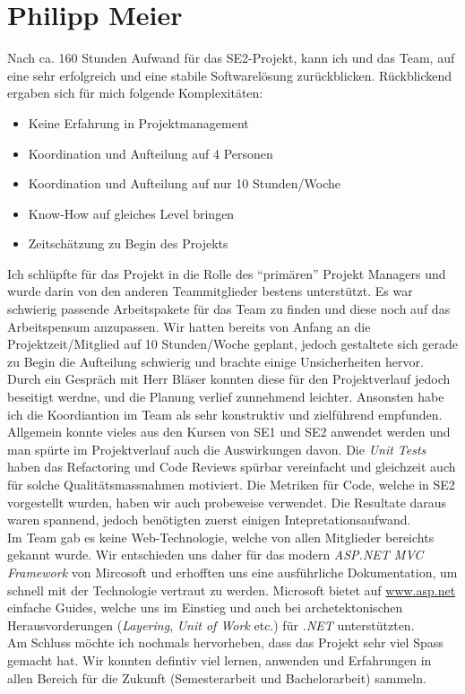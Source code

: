 	\section{Philipp Meier}
	Nach ca. 160 Stunden Aufwand für das SE2-Projekt, kann ich und das Team, auf eine sehr erfolgreich und eine stabile Softwarelösung zurückblicken. Rückblickend ergaben sich für mich folgende Komplexitäten:
	\\\begin{itemize}
		\item Keine Erfahrung in Projektmanagement
		\item Koordination und Aufteilung auf 4 Personen
		\item Koordination und Aufteilung auf nur 10 Stunden/Woche
		\item Know-How auf gleiches Level bringen
		\item Zeitschätzung zu Begin des Projekts
	\end{itemize}
	Ich schlüpfte für das Projekt in die Rolle des \enquote{primären} Projekt Managers und wurde darin von den anderen Teammitglieder bestens unterstützt. Es war schwierig passende Arbeitspakete für das Team zu finden und diese noch auf das Arbeitspensum anzupassen. Wir hatten bereits von Anfang an die Projektzeit/Mitglied auf 10 Stunden/Woche geplant, jedoch gestaltete sich gerade zu Begin die Aufteilung schwierig und brachte einige Unsicherheiten hervor. Durch ein Gespräch mit Herr Bläser konnten diese für den Projektverlauf jedoch beseitigt werdne, und die Planung verlief zunnehmend leichter. Ansonsten habe ich die Koordiantion im Team als sehr konstruktiv und zielführend empfunden.
	\\Allgemein konnte vieles aus den Kursen von SE1 und SE2 anwendet werden und man spürte im Projektverlauf auch die Auswirkungen davon. Die \textit{Unit Tests} haben das Refactoring und Code Reviews spürbar vereinfacht und gleichzeit auch für solche Qualitätsmassnahmen motiviert. Die Metriken für Code, welche in SE2 vorgestellt wurden, haben wir auch probeweise verwendet. Die Resultate daraus waren spannend, jedoch benötigten zuerst einigen Intepretationsaufwand.
	\\ Im Team gab es keine Web-Technologie, welche von allen Mitglieder bereichts gekannt wurde. Wir entschieden uns daher für das modern \textit{ASP.NET MVC Framework} von Mircosoft und erhofften uns eine ausführliche Dokumentation, um schnell mit der Technologie vertraut zu werden. 
	Microsoft bietet auf \href{http://www.asp.net/}{www.asp.net} einfache Guides, welche uns im Einstieg und auch bei archetektonischen Herausvorderungen (\textit{Layering}, \textit{Unit of Work} etc.) für \textit{.NET} unterstützten. 
	\\ Am Schluss möchte ich nochmals hervorheben, dass das Projekt sehr viel Spass gemacht hat. Wir konnten defintiv viel lernen, anwenden und Erfahrungen in allen Bereich für die Zukunft (Semesterarbeit und Bachelorarbeit) sammeln.


